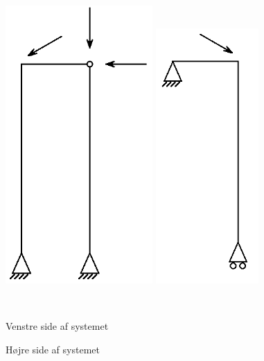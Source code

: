 \begin{figure}[htbp]\centering
	\begin{minipage}[b]{0.48\textwidth}\centering
		\includegraphics[width=0.50\textwidth]{billeder/venstre.png} %
	\end{minipage}\hfill
	\begin{minipage}[b]{0.48\textwidth}\centering
		\includegraphics[width=0.35\textwidth]{billeder/hojre.png} %
	\end{minipage}\\ %
	\begin{minipage}[t]{0.48\textwidth}
		\caption{Venstre side af systemet} %
		\label{fig:opdelingv}
	\end{minipage}\hfill
	\begin{minipage}[t]{0.48\textwidth}
		\caption{Højre side af systemet} %
		\label{fig:opdelingh}
	\end{minipage}
\end{figure}

